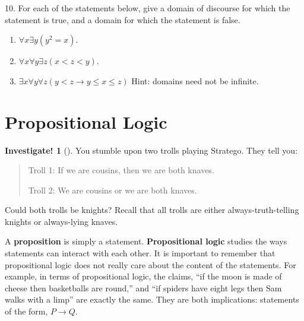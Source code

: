 \documentclass[12pt,]{book}
\newcommand{\terminology}[1]{\textbf{#1}}
\theoremstyle{plain}
\theoremstyle{definition}
\theoremstyle{definition}
\theoremstyle{definition}
\newtheorem{investigation}[project]{Investigate!}
\numberwithin{equation}{chapter}
\newcommand{\imp}{\rightarrow}
\newcommand{\lt}{<}
\begin{document}
\begin{exerciselist}
\par\smallskip
\item[10.]\hypertarget{exercise-140}{}\hypertarget{p-1192}{}%
For each of the statements below, give a domain of discourse for which the statement is true, and a domain for which the statement is false.%
\par
\hypertarget{p-1193}{}%
\leavevmode%
\begin{enumerate}[label=(\alph*)]
\item\hypertarget{li-607}{}\(\forall x \exists y (y^2 = x)\).%
\item\hypertarget{li-608}{}\(\forall x \forall y \exists z (x \lt  z \lt  y)\).%
\item\hypertarget{li-609}{}\(\exists x \forall y \forall z (y \lt  z \imp y \le x \le z)\) Hint: domains need not be infinite.%
\end{enumerate}
%
\par\smallskip
\end{exerciselist}
\typeout{************************************************}
\typeout{************************************************}
\section[{Propositional Logic}]{Propositional Logic}\label{sec_propositional}
\begin{investigation}[]\label{investigation-15}
\hypertarget{p-1198}{}%
You stumble upon two trolls playing Stratego\textregistered{}.  They tell you:%
\begin{quote}\hypertarget{blockquote-6}{}
\hypertarget{p-1199}{}%
Troll 1: If we are cousins, then we are both knaves.%
\par
\hypertarget{p-1200}{}%
Troll 2: We are cousins or we are both knaves.%
\end{quote}
\hypertarget{p-1201}{}%
Could both trolls be knights?  Recall that all trolls are either always-truth-telling knights or always-lying knaves.%
\end{investigation}
\hypertarget{p-1202}{}%
A \terminology{proposition} is simply a statement. \terminology{Propositional logic} studies the ways statements can interact with each other. It is important to remember that propositional logic does not really care about the content of the statements. For example, in terms of propositional logic, the claims, ``if the moon is made of cheese then basketballs are round,'' and ``if spiders have eight legs then Sam walks with a limp'' are exactly the same. They are both implications: statements of the form, \(P \imp Q\).%
\typeout{************************************************}
\typeout{************************************************}
\end{document}
